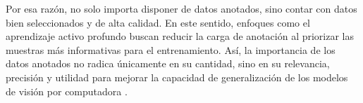 Por esa razón, no solo importa disponer de datos anotados, sino contar con datos bien seleccionados y de alta calidad. En este sentido, enfoques como el aprendizaje activo profundo buscan reducir la carga de anotación al priorizar las muestras más informativas para el entrenamiento. Así, la importancia de los datos anotados no radica únicamente en su cantidad, sino en su relevancia, precisión y utilidad para mejorar la capacidad de generalización de los modelos de visión por computadora \cite{wu2022deep_active_learning}.